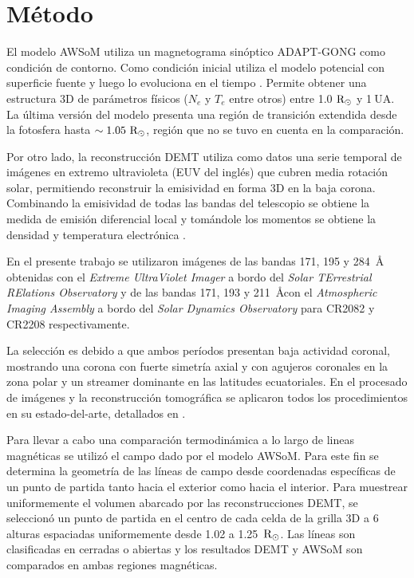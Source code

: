 \documentclass[baaa]{baaa}
\begin{document}
\section{Método}
El modelo AWSoM utiliza un magnetograma sinóptico ADAPT-GONG \citep{arge_2010} como condición de contorno. Como 
condición inicial utiliza el modelo potencial con superficie fuente y luego lo evoluciona en el tiempo 
\citep{vander_2010}. Permite obtener una estructura 3D de parámetros físicos ($N_e$ y $T_e$ entre otros) entre 
1.0$~{\rm R_\odot}$ y 1$~$UA. La última versión del modelo presenta una región de transición extendida desde la 
fotosfera hasta $\sim1.05~{\rm R_\odot}$, región que no se tuvo en cuenta en la comparación.


Por otro lado, la reconstrucción DEMT utiliza como datos una serie temporal de imágenes {en extremo ultravioleta (EUV 
del inglés)} que cubren media rotación solar, permitiendo reconstruir la emisividad en forma 3D en la baja corona. 
Combinando la emisividad de todas las bandas del telescopio se obtiene la {medida de emisión diferencial local} y 
tomándole los momentos se obtiene la densidad y temperatura electrónica \citep{frazin_2009}.  

En el presente trabajo se utilizaron imágenes {de las bandas 171, 195 y 284~\AA} obtenidas con el \textsl{Extreme 
UltraViolet 
Imager} {\citep{wuelser_2004}} a bordo del \textsl{Solar TErrestrial RElations Observatory} y de las bandas 171, 193 y 
211~\AA con el \textsl{Atmospheric Imaging Assembly} {\citep{lemen_2012}} a bordo del \textsl{Solar Dynamics 
Observatory} para CR2082 y CR2208 respectivamente.

La selección es debido a que ambos períodos presentan baja actividad coronal, mostrando una corona con fuerte simetría axial y con agujeros coronales en la zona polar y un streamer dominante en las latitudes ecuatoriales. En el procesado de imágenes y la reconstrucción tomográfica se aplicaron todos los procedimientos en su estado-del-arte, detallados en \citet{lloveras_ba2017}.

Para llevar a cabo una comparación termodinámica a lo largo de lineas magnéticas se utilizó el campo dado por el modelo 
AWSoM. Para este fin se determina la geometría de las líneas de campo desde coordenadas específicas de un punto de 
partida tanto hacia el exterior como hacia el interior. Para muestrear uniformemente el volumen abarcado por las 
reconstrucciones DEMT, se seleccionó un punto de partida en el centro de cada celda de la grilla 3D a 6 alturas 
espaciadas uniformemente desde 1.02 a 1.25~${\rm R_\odot}$. Las líneas son clasificadas en cerradas o abiertas y los 
resultados DEMT y AWSoM son comparados en ambas regiones magnéticas.
\end{document}
